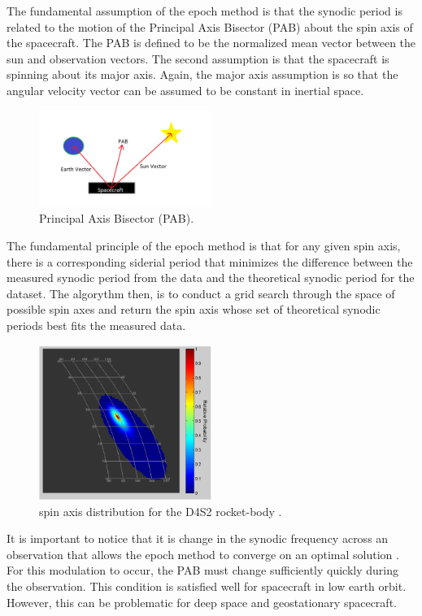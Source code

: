 \documentclass{article}
\begin{document}
The fundamental assumption of the epoch method is that the synodic period is related to the motion of the Principal Axis Bisector (PAB) about the spin axis of the spacecraft. The PAB is defined to be the normalized mean vector between the sun and observation vectors. The second assumption is that the spacecraft is spinning about its major axis. Again, the major axis assumption is so that the angular velocity vector can be assumed to be constant in inertial space.

\begin{figure}[h]
	\centering
	\includegraphics[width=0.5\textwidth]{PAB}
	\caption{Principal Axis Bisector (PAB).}
\end{figure}

The fundamental principle of the epoch method is that for any given spin axis, there is a corresponding siderial period that minimizes the difference between the measured synodic period from the data and the theoretical synodic period for the dataset. The algorythm then, is to conduct a grid search through the space of possible spin axes and return the spin axis whose set of theoretical synodic periods best fits the measured data.

\begin{figure}[h]
	\centering
	\includegraphics[width=0.5\textwidth]{spin_axis_OPTICAL_CHARACTERIZATION}
	\caption{spin axis distribution for the D4S2 rocket-body \cite{Hall2014OpticalCO}.}
\end{figure}

It is important to notice that it is change in the synodic frequency across an observation that allows the epoch method to converge on an optimal solution \cite{Wallace}. For this modulation to occur, the PAB must change sufficiently quickly during the observation. This condition is satisfied well for spacecraft in low earth orbit. However, this can be problematic for deep space and geostationary spacecraft.
\end{document}

